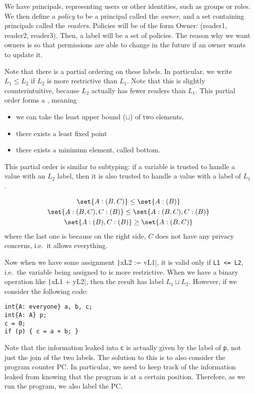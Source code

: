 \documentclass[class=scrartcl]{standalone}
\begin{document}
We have principals, representing users or other identities,
such as groups or roles.
We then define a \emph{policy} to be
  a principal called the \emph{owner}, and a set
  containing principals called the \emph{readers}.
Policies will be of the form \textsf{Owner: (reader1, reader2, reader3)}.
Then, a label will be a set of policies.
The reason why we want owners is so that
permissions are able to change in the future
if an owner wants to update it.

Note that there is a partial ordering on these labels.
In particular, we write \(L_1 \leq L_2\)
if \(L_2\) is more restrictive than \(L_1\).
Note that this is slightly counterintuitive,
because \(L_2\) actually has fewer readers than \(L_1\).
This partial order forms a , meaning
\begin{itemize}[nosep]
  \item we can take the least upper bound (\(\sqcup\)) of two elements,
  \item there exists a least fixed point
  \item there exists a minimum element, called bottom.
\end{itemize}

This partial order is similar to subtyping:
if a variable is trusted to handle a value with an \(L_2\) label,
then it is also trusted to handle a value with a label of \(L_1\).

\begin{example}
  \begin{gather*}
    \set{A: (B, C)} \leq \set{A: (B)} \\
    \set{A: (B, C), C: (B)} \leq \set{A: (B, C), C: (B)} \\
    \set{A: (B), C: (B)} \geq \set{A: (B, C)}
  \end{gather*}
  where the last one is because on the right side,
  \(C\) does not have any privacy concerns,
  i.e.\ it allows everything.
\end{example}

Now when we have some assignment \texttt|x{L2} := v{L1}|,
it is valid only if \texttt{L1 <= L2},
i.e.\ the variable being assigned to is more restrictive.
When we have a binary operation like \texttt|x{L1} + y{L2}|,
then the result has label \(L_1 \sqcup L_2\).
However, if we consider the following code:
\begin{verbatim}
int{A: everyone} a, b, c;
int{A: A} p;
c = 0;
if (p) { c = a + b; }
\end{verbatim}
Note that the information leaked into \texttt{c} is actually
given by the label of \texttt{p},
not just the join of the two labels.
The solution to this is to also consider the program counter PC.
In particular, we need to keep track of the information leaked
from knowing that the program is at a certain position.
Therefore, as we run the program, we also label the PC.
\end{document}

